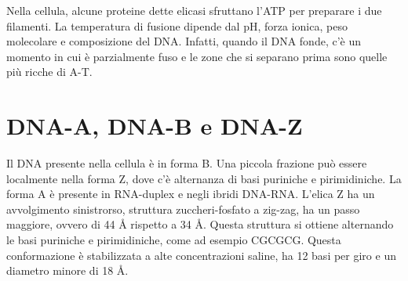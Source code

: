 
Nella cellula, alcune proteine dette elicasi sfruttano l'ATP per preparare i due filamenti.
La temperatura di fusione dipende dal pH, forza ionica, peso molecolare e composizione del DNA.
Infatti, quando il DNA fonde, c'è un momento in cui è parzialmente fuso e le zone che si separano prima sono quelle più ricche di A-T.



\clearpage

\section{DNA-A, DNA-B e DNA-Z}

\begingroup
\begin{table}
\caption{Tipologie di DNA}
\end{table}
\endgroup

Il DNA presente nella cellula è in forma B. Una piccola frazione può essere localmente nella forma Z, dove c'è alternanza di basi puriniche e pirimidiniche. La forma A è presente in RNA-duplex e negli ibridi DNA-RNA.{}
L'elica Z ha un avvolgimento sinistrorso, struttura zuccheri-fosfato a zig-zag, ha un passo maggiore, ovvero di 44 \AA{} rispetto a 34 \AA.
Questa struttura si ottiene alternando le basi puriniche e pirimidiniche, come ad esempio CGCGCG.{} Questa conformazione è stabilizzata a alte concentrazioni saline, ha 12 basi per giro e un diametro minore di 18 \AA.

